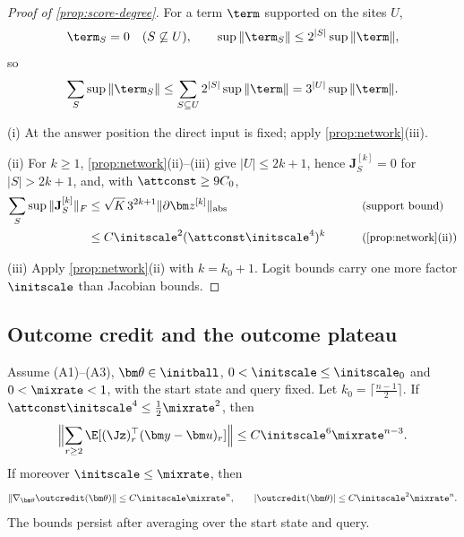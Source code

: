 \begin{proof}[Proof of \cref{prop:score-degree}]
For a term $\term$ supported on the sites $U$,
\[
 \term_S=0\quad(S\not\subseteq U),\qquad \sup\|\term_S\|\le2^{|S|}\sup\|\term\|,
\]
so
\[
 \sum_S\sup\|\term_S\|\le\sum_{S\subseteq U}2^{|S|}\sup\|\term\|=3^{|U|}\sup\|\term\| .
\]

\noindent(i) At the answer position the direct input is fixed; apply \cref{prop:network}(iii).

\smallskip\noindent(ii) For $k\ge1$, \cref{prop:network}(ii)--(iii) give $|U|\le2k+1$, hence $\mathbf J^{[k]}_S=0$ for $|S|>2k+1$, and, with $\attconst\ge9C_0$,
\begin{alignat*}{2}
 \sum_S\sup\|\mathbf J^{[k]}_S\|_F&\le\sqrt K\,3^{2k+1}\|\partial\bm z^{[k]}\|_{\mathrm{abs}} &\qquad& \why{support bound}\\
 &\le C\initscale^2(\attconst\initscale^4)^k && \why{\cref{prop:network}(ii)}
\end{alignat*}

\noindent(iii) Apply \cref{prop:network}(ii) with $k=k_0+1$. Logit bounds carry one more factor $\initscale$ than Jacobian bounds.
\end{proof}

\subsection{Outcome credit and the outcome plateau}
\label{app:thm1}

\begin{lemma}
\label{lem:score-sum}
Assume (A1)--(A3), $\bm\theta\in\initball$, $0<\initscale\le\initscale_0$ and $0<\mixrate<1$, with the start state and query fixed. Let
$k_0=\lceil\frac{n-1}{2}\rceil$. If $\attconst\initscale^4\le\frac{1}{2}\mixrate^2$, then
\[
 \Bigl\|\sum_{r\ge2}\E[(\Jz)_r^\top(\bm y-\bm u)_r]\Bigr\|\le C\initscale^6\mixrate^{n-3}.
\]
If moreover $\initscale\le\mixrate$, then
\begin{equation}
 \|\nabla_{\bm\theta}\outcredit(\bm\theta)\|\le C\initscale\mixrate^n,\qquad |\outcredit(\bm\theta)|\le C\initscale^2\mixrate^n.
 \label{eq:thm1-full}
\end{equation}
The bounds persist after averaging over the start state and query.
\end{lemma}

